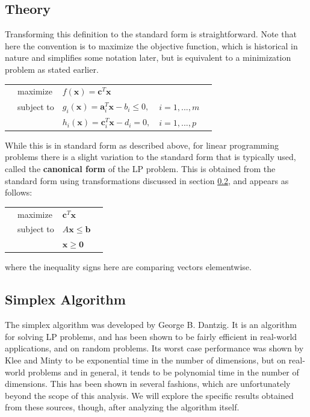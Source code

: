 \documentclass[10pt]{article}
\renewcommand{\vec}[1]{\mathbf{#1}}
\newcommand{\x}{\vec{x}}
\newcommand{\vz}[1]{\vec{0}_{#1}}
\renewcommand{\a}{\vec{a}}
\renewcommand{\b}{\vec{b}}
\renewcommand{\c}{\vec{c}}
\begin{document}
\subsection{Theory}
Transforming this definition to the standard form is straightforward. Note that here the convention is to maximize the objective function, which is historical in nature and simplifies some notation later, but is equivalent to a minimization problem as stated earlier.\\
\begin{tabularx}{\textwidth}{X l l l X}
	& maximize		& $f(\x) = \c ^T\x$						& 				& \\
	& subject to	& $g_i(\x) = \a _i^T\x - b_i \leq 0,$	& $i=1,...,m$	& \\
	& 				& $h_i(\x) = \c _i^T\x - d_i = 0,$		& $i=1,...,p$
\end{tabularx}
While this is in standard form as described above, for linear programming problems there is a slight variation to the standard form that is typically used, called the \textbf{canonical form} of the LP problem. This is obtained from the standard form using transformations discussed in section \ref{lp:sa}, and appears as follows:\\
\begin{tabularx}{\textwidth}{X l l X}
	& maximize		& $\c^T\x$ & \\
	& subject to	& $A\x\leq \b $ & \\
	& 				& $\x\geq\vz{}$ & 
\end{tabularx}
where the inequality signs here are comparing vectors elementwise.
\subsection{Simplex Algorithm}
\label{lp:sa}
The simplex algorithm was developed by George B. Dantzig. It is an algorithm for solving LP problems, and has been shown to be fairly efficient in real-world applications, and on random problems. Its worst case performance was shown by Klee and Minty to be exponential time in the number of dimensions, but on real-world problems and in general, it tends to be polynomial time in the number of dimensions. This has been shown in several fashions, which are unfortunately beyond the scope of this analysis. We will explore the specific results obtained from these sources, though, after analyzing the algorithm itself.
\end{document}

